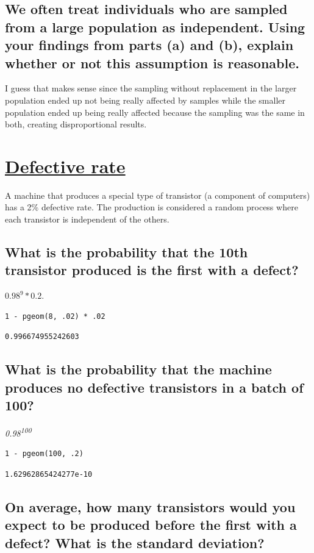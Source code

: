 \documentclass[11pt]{article}
\begin{document}
\subsection{We often treat individuals who are sampled from a large population as independent. Using your findings from parts (a) and (b), explain whether or not this assumption is reasonable.}
\label{sec:org1c231ec}
I guess that makes sense since the sampling without replacement in the larger population ended up not being really affected by samples while the smaller population ended up being really affected because the sampling was the same in both, creating disproportional results.

\section{\underline{Defective rate}}
\label{sec:org09352b1}
A machine that produces a special type of transistor (a component of computers) has a 2\% defective rate. The production is considered a random process where each transistor is independent of the others.
\subsection{What is the probability that the 10th transistor produced is the first with a defect?}
\label{sec:org1eee3fc}
\(0.98^{9} * 0.2\).
\begin{verbatim}
1 - pgeom(8, .02) * .02
\end{verbatim}

\begin{verbatim}
0.996674955242603
\end{verbatim}

\subsection{What is the probability that the machine produces no defective transistors in a batch of 100?}
\label{sec:org0ad0548}
\emph{0.98\textsuperscript{100}}

\begin{verbatim}
1 - pgeom(100, .2)
\end{verbatim}

\begin{verbatim}
1.62962865424277e-10
\end{verbatim}

\subsection{On average, how many transistors would you expect to be produced before the first with a defect? What is the standard deviation?}
\label{sec:orgd22c9ca}
\end{document}

